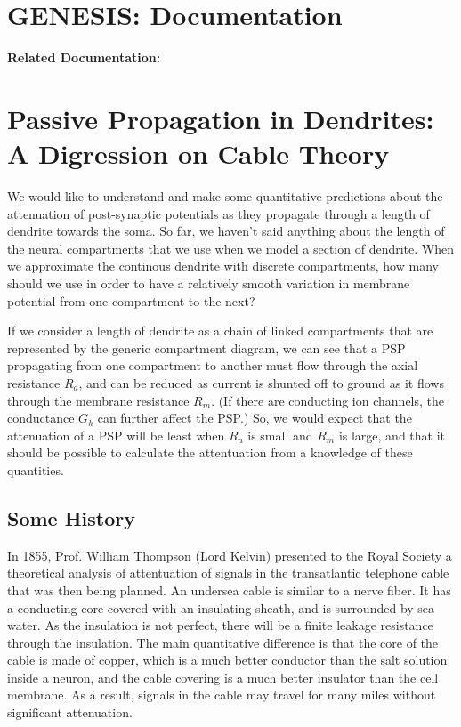 \documentclass[12pt]{article}
\begin{document}
\section*{GENESIS: Documentation}

{\bf Related Documentation:}

\section*{Passive Propagation in Dendrites: A Digression on Cable Theory}

We would like to understand and make some quantitative predictions about the attenuation of post-synaptic potentials as they propagate through a length of dendrite towards the soma. So far, we haven't said anything about the length of the neural compartments that we use when we model a section of dendrite. When we approximate the continous dendrite with discrete compartments, how many should we use in order to have a relatively smooth variation in membrane potential from one compartment to the next?

If we consider a length of dendrite as a chain of linked compartments that are represented by the generic compartment diagram, we can see that a PSP propagating from one compartment to another must flow through the axial resistance $R_a$, and can be reduced as current is shunted off to ground as it flows through the membrane resistance $R_m$. (If there are conducting ion channels, the conductance $G_k$ can further affect the PSP.) So, we would expect that the attenuation of a PSP will be least when $R_a$ is small and $R_m$ is large, and that it should be possible to calculate the attentuation from a knowledge of these quantities.

\subsection*{Some History}

In 1855, Prof. William Thompson (Lord Kelvin) presented to the Royal Society a theoretical analysis of attentuation of signals in the transatlantic telephone cable that was then being planned. An undersea cable is similar to a nerve fiber. It has a conducting core covered with an insulating sheath, and is surrounded by sea water. As the insulation is not perfect, there will be a finite leakage resistance through the insulation. The main quantitative difference is that the core of the cable is made of copper, which is a much better conductor than the salt solution inside a neuron, and the cable covering is a much better insulator than the cell membrane. As a result, signals in the cable may travel for many miles without significant attenuation.
\end{document}
